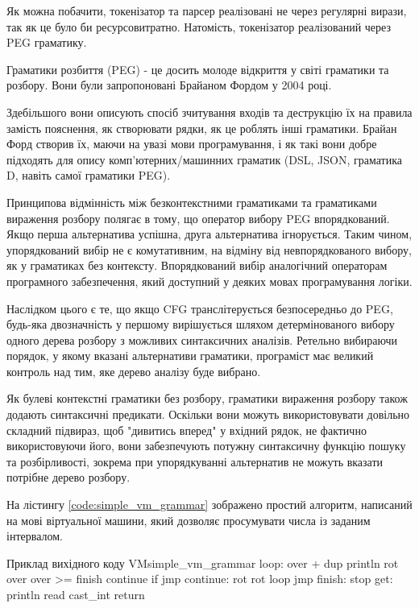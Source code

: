 \documentclass{lib/styles/default-style}
\begin{document}
    Як можна побачити, токенізатор та парсер реалізовані не через регулярні вирази, так як це було би ресурсовитратно.
    Натомість, токенізатор реалізований через PEG граматику.

    Граматики розбиття (PEG) - це досить молоде відкриття у світі граматики та розбору.
    Вони були запропоновані Брайаном Фордом у 2004 році.

    Здебільшого вони описують спосіб зчитування входів та
    деструкцію їх на правила замість пояснення,
    як створювати рядки, як це роблять інші граматики.
    Брайан Форд створив їх, маючи на увазі мови програмування,
    і як такі вони добре підходять для опису комп'ютерних/машинних граматик (DSL, JSON, граматика D, навіть самої граматики PEG).

    Принципова відмінність між безконтекстними граматиками та граматиками вираження розбору
    полягає в тому, що оператор вибору PEG впорядкований.
    Якщо перша альтернатива успішна, друга альтернатива ігнорується.
    Таким чином, упорядкований вибір не є комутативним,
    на відміну від невпорядкованого вибору, як у граматиках без контексту.
    Впорядкований вибір аналогічний операторам програмного забезпечення, який доступний у деяких мовах програмування логіки.

    Наслідком цього є те, що якщо CFG транслітерується безпосередньо до
    PEG, будь-яка двозначність у першому вирішується шляхом детермінованого вибору одного
    дерева розбору з можливих синтаксичних аналізів.
    Ретельно вибираючи порядок, у якому вказані альтернативи
    граматики, програміст має великий контроль над тим, яке дерево аналізу буде вибрано.

    Як булеві контекстні граматики без розбору, граматики вираження розбору
    також додають синтаксичні предикати. Оскільки вони можуть використовувати довільно складний підвираз,
    щоб "дивитись вперед" у вхідний рядок, не фактично використовуючи його,
    вони забезпечують потужну синтаксичну функцію пошуку та розбірливості,
    зокрема при упорядкуванні альтернатив не можуть вказати потрібне дерево розбору.


    На лістингу \ref{code:simple_vm_grammar} зображено простий алгоритм, написаний на мові віртуальної машини,
    який дозволяє просумувати числа із заданим інтервалом.
    
    \begin{code}{Приклад вихідного коду VM}{simple_vm_grammar}        
        loop:
        over + dup println
        rot over over
        >= finish continue if jmp
        continue:
        rot rot
        loop jmp
        finish:
        stop
        get:
        println read cast_int return\end{code}
\end{document}
